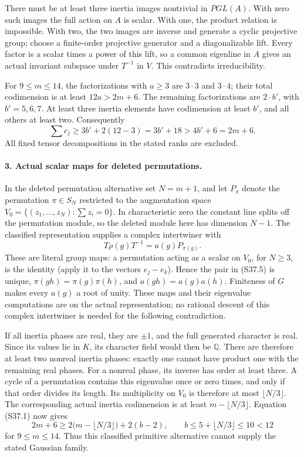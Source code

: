There must be at least three inertia images nontrivial in
\(PGL(A)\). With zero such images the full action on \(A\)
is scalar. With one, the product relation is impossible. With two,
the two images are inverse and generate a cyclic projective group;
choose a finite-order projective generator and a diagonalizable
lift. Every factor is a scalar times a power of this lift, so a
common eigenline in \(A\) gives an actual invariant subspace
under \(T^{-1}\) in \(V\). This contradicts irreducibility.

For \(9\le m\le14\), the factorizations with \(a\ge3\)
are \(3\cdot3\) and \(3\cdot4\); their total codimension
is at least \(12a>2m+6\). The remaining factorizations are
\(2\cdot b'\), with \(b'=5,6,7\). At least three inertia
elements have codimension at least \(b'\), and all others at
least two. Consequently
\[
        \sum c_j\ge 3b'+2(12-3)=3b'+18>4b'+6=2m+6.
                                                               \tag{S37.4}
\]
All fixed tensor decompositions in the stated ranks are excluded.

\paragraph{3. Actual scalar maps for deleted permutations.}
In the deleted permutation alternative set \(N=m+1\), and
let \(P_\pi\) denote the permutation \(\pi\in S_N\)
restricted to the augmentation space
\(V_0=\{(z_1,\ldots,z_N):\sum z_i=0\}\).
In characteristic zero the constant line splits off the permutation
module, so the deleted module here has dimension \(N-1\).
The classified representation supplies a complex intertwiner with
\[
                  T\rho(g)T^{-1}=a(g)P_{\pi(g)}.             \tag{S37.5}
\]
These are literal group maps: a permutation acting as a scalar on
\(V_0\), for \(N\ge3\), is the identity (apply it to the
vectors \(e_j-e_k\)). Hence the pair in (S37.5) is unique,
\(\pi(gh)=\pi(g)\pi(h)\), and \(a(gh)=a(g)a(h)\).
Finiteness of \(G\) makes every \(a(g)\) a root of unity.
These maps and their eigenvalue computations are on the actual
representation; no rational descent of this complex intertwiner
is needed for the following contradiction.

If all inertia phases are real, they are \(\pm1\), and the
full generated character is real. Since its values lie in
\(K\), its character field would then be \(\mathbb Q\).
There are therefore at least two nonreal inertia phases: exactly
one cannot have product one with the remaining real phases.
For a nonreal phase, its inverse has order at least three.
A cycle of a permutation contains this eigenvalue once or zero
times, and only if that order divides its length. Its multiplicity
on \(V_0\) is therefore at most \(\lfloor N/3\rfloor\).
The corresponding actual inertia codimension is at least
\(m-\lfloor N/3\rfloor\). Equation (S37.1) now gives
\[
 2m+6\ge2\bigl(m-\lfloor N/3\rfloor\bigr)+2(b-2),
 \qquad b\le5+\lfloor N/3\rfloor\le10<12                  \tag{S37.6}
\]
for \(9\le m\le14\). Thus this classified primitive
alternative cannot supply the stated Gaussian family.


